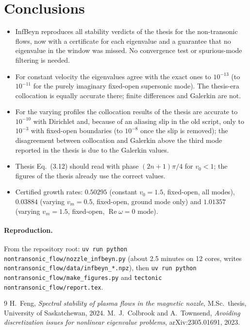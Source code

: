 \documentclass[11pt]{article}
\newcommand{\Real}{\operatorname{Re}}
\newcommand{\infbeyn}{InfBeyn}
\begin{document}
\section{Conclusions}

\begin{itemize}
  \item \infbeyn{} reproduces all stability verdicts of the thesis for the non-transonic flows, now with a
  certificate for each eigenvalue and a guarantee that no eigenvalue in the window was missed. No
  convergence test or spurious-mode filtering is needed.
  \item For constant velocity the eigenvalues agree with the exact ones to $10^{-13}$ (to $10^{-11}$ for the
  purely imaginary fixed-open supersonic mode). The thesis-era collocation is equally accurate there; finite
  differences and Galerkin are not.
  \item For the varying profiles the collocation results of the thesis are accurate to $10^{-10}$ with
  Dirichlet and, because of an aliasing slip in the old script, only to $10^{-3}$ with fixed-open boundaries
  (to $10^{-8}$ once the slip is removed); the disagreement between collocation and Galerkin above the third
  mode reported in the thesis is due to the Galerkin values.
  \item Thesis Eq.~(3.12) should read with phase $(2n+1)\pi/4$ for $v_0<1$; the figures of the thesis
  already use the correct values.
  \item Certified growth rates: $0.50295$ (constant $v_0=1.5$, fixed-open, all modes), $0.03884$ (varying
  $v_m=0.5$, fixed-open, ground mode only) and $1.01357$ (varying $v_m=1.5$, fixed-open, $\Real\omega=0$ mode).
\end{itemize}

\paragraph{Reproduction.} From the repository root:
\texttt{uv run python nontransonic\_flow/nozzle\_infbeyn.py} (about 2.5 minutes on 12 cores, writes
\texttt{nontransonic\_flow/data/infbeyn\_*.npz}), then
\texttt{uv run python nontransonic\_flow/make\_figures.py} and
\texttt{tectonic nontransonic\_flow/report.tex}.

\begin{thebibliography}{9}
 H.~Feng, \emph{Spectral stability of plasma flows in the magnetic nozzle}, M.Sc.\ thesis,
University of Saskatchewan, 2024.
 M.~J.~Colbrook and A.~Townsend, \emph{Avoiding discretization issues for nonlinear
eigenvalue problems}, arXiv:2305.01691, 2023.
\end{thebibliography}
\end{document}
